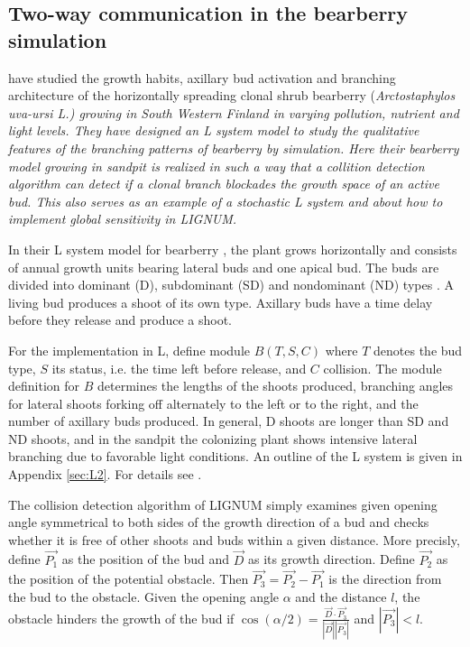 \subsection{Two-way communication in the bearberry simulation}
\label{sec:bearberry}

\citet{salemaa:02}  have  studied  the  growth  habits,  axillary  bud
activation  and branching architecture  of the  horizontally spreading
clonal shrub  bearberry (\it Arctostaphylos uva-ursi  \rm L.)  growing
in  South Western  Finland in  varying pollution,  nutrient  and light
levels.  They have designed an L system model to study the qualitative
features of  the branching patterns of bearberry  by simulation.  Here
their bearberry  model growing  in sandpit is  realized in such  a way
that a  collition detection  algorithm can detect  if a  clonal branch
blockades the growth  space of an active bud.  This  also serves as an
example  of a  stochastic  L  system \citep{pp:90}  and  about how  to
implement global sensitivity \citep{kurth:94} in LIGNUM.

In their  L system model  for bearberry \citep{salemaa:02},  the plant
grows horizontally and consists of annual growth units bearing lateral
buds  and one apical  bud.  The  buds are  divided into  dominant (D),
subdominant  (SD) and nondominant  (ND) types  \citep{remphrey:83}.  A
living bud  produces a shoot  of its own  type.  Axillary buds  have a
time delay before they release and produce a shoot.

For  the  implementation in  L,  define  module  $B(T,S,C)$ where  $T$
denotes  the bud  type,  $S$ its  status,  i.e. the  time left  before
release, and $C$ collision.   The module definition for $B$ determines
the  lengths of  the  shoots produced,  branching  angles for  lateral
shoots forking  off alternately to the  left or to the  right, and the
number of  axillary buds  produced.  In general,  D shoots  are longer
than SD and  ND shoots, and in the sandpit  the colonizing plant shows
intensive  lateral branching  due to  favorable light  conditions.  An
outline  of the  L  system  is given  in  Appendix \ref{sec:L2}.   For
details see \citet{salemaa:02}.

The  collision detection  algorithm  of LIGNUM  simply examines  given
opening angle symmetrical  to both sides of the  growth direction of a
bud and  checks whether it is free  of other shoots and  buds within a
given distance.  More precisly, define $\vec {P_1}$ as the position of
the bud and $\vec D$ as  its growth direction.  Define $\vec {P_2}$ as
the position of the potential  obstacle. Then $\vec {P_3} = \vec {P_2}
- \vec {P_1}$  is the direction from  the bud to  the obstacle.  Given
the opening angle $\alpha$ and  the distance $l$, the obstacle hinders
the growth of the bud  if $\cos(\alpha/2) = \frac{{\vec D} \cdot {\vec
{P_3}}} {|\vec D||\vec {P_3}|}$ and $|\vec {P_3}| < l$.

